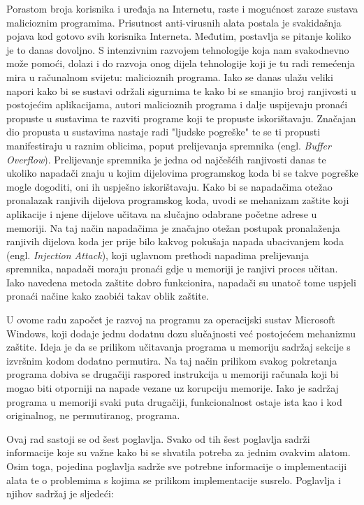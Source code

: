 \documentclass[times, utf8, diplomski, numeric]{fer}
\begin{document}
Porastom broja korisnika i uređaja na Internetu, raste i
mogućnost zaraze sustava malicioznim programima. Prisutnost
anti-virusnih alata postala je svakidašnja pojava kod gotovo svih
korisnika Interneta. Međutim, postavlja se pitanje koliko je to
danas dovoljno. S intenzivnim razvojem tehnologije koja nam
svakodnevno može pomoći, dolazi i do razvoja onog dijela
tehnologije koji je tu radi remećenja mira u računalnom svijetu:
malicioznih programa. Iako se danas ulažu veliki napori kako bi se
sustavi održali sigurnima te kako bi se smanjio broj ranjivosti u
postojećim aplikacijama, autori malicioznih programa i dalje
uspijevaju pronaći propuste u sustavima te razviti programe koji
te propuste iskorištavaju. Značajan dio propusta u sustavima
nastaje radi "ljudske pogreške" te se ti propusti manifestiraju u		%
raznim oblicima, poput prelijevanja spremnika (engl. \emph{Buffer
Overflow}). Prelijevanje spremnika je jedna od najčešćih ranjivosti danas te
ukoliko napadači znaju u kojim dijelovima programskog koda bi se
takve pogreške mogle dogoditi, oni ih uspješno iskorištavaju.
Kako bi se napadačima otežao pronalazak ranjivih dijelova
programskog koda, uvodi se mehanizam zaštite koji aplikacije i
njene dijelove učitava na slučajno odabrane početne adrese u
memoriji. Na taj način napadačima je značajno otežan postupak			%
pronalaženja ranjivih dijelova koda jer prije bilo kakvog
pokušaja napada ubacivanjem koda (engl. \emph{Injection Attack}),
koji uglavnom prethodi napadima prelijevanja spremnika, napadači
moraju pronaći gdje u memoriji je ranjivi proces učitan. Iako
navedena metoda zaštite dobro funkcionira, napadači su unatoč
tome uspjeli pronaći načine kako zaobići takav oblik zaštite.

U ovome radu započet je razvoj na programu za operacijski sustav
Microsoft Windows, koji dodaje jednu dodatnu dozu slučajnosti već
postojećem mehanizmu zaštite. Ideja je da se prilikom učitavanja
programa u memoriju sadržaj sekcije s izvršnim kodom dodatno
permutira. Na taj način prilikom svakog pokretanja programa
dobiva se drugačiji raspored instrukcija u memoriji računala koji
bi mogao biti otporniji na napade vezane uz korupciju memorije.
Iako je sadržaj programa u memoriji svaki puta drugačiji,
funkcionalnost ostaje ista kao i kod originalnog, ne
permutiranog, programa.

Ovaj rad sastoji se od šest poglavlja. Svako od tih šest
poglavlja sadrži informacije koje su važne kako bi se shvatila
potreba za jednim ovakvim alatom. Osim toga, pojedina poglavlja
sadrže sve potrebne informacije o implementaciji alata te o
problemima s kojima se prilikom implementacije susrelo.
Poglavlja i njihov sadržaj je sljedeći:
\end{document}
